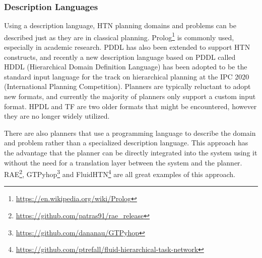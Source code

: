 \subsubsection{Description Languages}
Using a description language, HTN planning domains and problems can be described just as they are in classical planning. Prolog\footnote{\url{https://en.wikipedia.org/wiki/Prolog}} is commonly used, especially in academic research. PDDL has also been extended to support HTN constructs, and recently a new description language based on PDDL called HDDL (Hierarchical Domain Definition Language) has been adopted to be the standard input language for the track on hierarchical planning at the IPC 2020 (International Planning Competition). Planners are typically reluctant to adopt new formats, and currently the majority of planners only support a custom input format. HPDL and TF are two older formats that might be encountered, however they are no longer widely utilized. 


\begin{table}[H]
    \centering
    \caption{The stack task from the block-world domain in different formats.}
    \label{tab:my-table}
\end{table}



There are also planners that use a programming language to describe the domain and problem rather than a specialized description language. This approach has the advantage that the planner can be directly integrated into the system using it without the need for a translation layer between the system and the planner. RAE\footnote{\url{https://github.com/patras91/rae_release}}, GTPyhop\footnote{\url{https://github.com/dananau/GTPyhop}} and FluidHTN\footnote{\url{https://github.com/ptrefall/fluid-hierarchical-task-network}} are all great examples of this approach.

